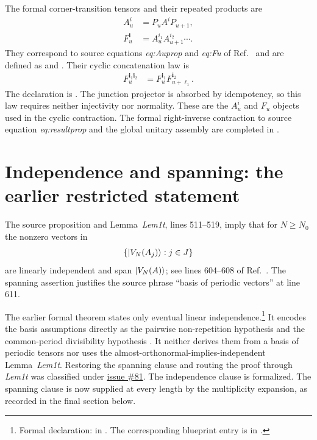 \documentclass{article}
\begin{document}
The formal corner-transition tensors and their repeated products are
\begin{align}
    A_u^i
    &=P_uA^iP_{u+1},
    \label{eq:dccsp17_periodic_overlap_route_alignment_corner_transition}\\
    F_u^{\mathbf i}
    &=A_u^{i_1}A_{u+1}^{i_2}\cdots.
    \label{eq:dccsp17_periodic_overlap_route_alignment_corner_product}
\end{align}
They correspond to source equations \emph{eq:Auprop} and \emph{eq:Fu} of
Ref.~\cite{DeLasCuevas2017Irreducible} and are defined as
 and . Their cyclic
concatenation law is
\begin{align}
    F_u^{\mathbf i_1\mathbf i_2}
    &=F_u^{\mathbf i_1}
      F_{u+\ell_1}^{\mathbf i_2}.
    \label{eq:dccsp17_periodic_overlap_route_alignment_corner_concatenation}
\end{align}
The declaration is . The junction
projector is absorbed by idempotency, so this law requires neither injectivity
nor normality. These are the $A_u^i$ and $F_u$ objects used in the cyclic
contraction. The formal right-inverse contraction to source equation
\emph{eq:resultprop} and the global unitary assembly are completed in
.

\section{Independence and spanning: the earlier restricted statement}

The source proposition and Lemma~\emph{Lem1t}, lines 511--519, imply that for
$N\geq N_0$ the nonzero vectors in
\begin{align}
    \left\{|V_N(A_j)\rangle:j\in J\right\}
    \label{eq:dccsp17_periodic_overlap_route_alignment_periodic_vector_family}
\end{align}
are linearly independent and span $|V_N(A)\rangle$; see lines 604--608 of
Ref.~\cite{DeLasCuevas2017Irreducible}. The spanning assertion justifies the
source phrase ``basis of periodic vectors'' at line 611.

The earlier formal theorem states only eventual linear independence.\footnote{Formal
declaration:
 in
. The corresponding blueprint entry is in
.}
It encodes the basis assumptions directly as the pairwise non-repetition
hypothesis  and the common-period divisibility hypothesis
. It neither derives them from a basis of periodic tensors nor
uses the almost-orthonormal-implies-independent Lemma~\emph{Lem1t}. Restoring
the spanning clause and routing the proof through \emph{Lem1t} was classified
under \href{https://github.com/LionSR/TNLean/issues/81}{issue \#81}. The
independence clause is formalized. The spanning clause is now supplied at every
length by the multiplicity expansion, as recorded in the final section below.
\end{document}
